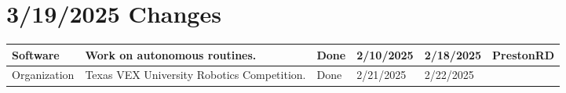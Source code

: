 \section{3/19/2025 Changes}
\begin{center}
\begin{longtable}{| p{40pt} | p{150pt} | p{35pt} | p{33pt} | p{33pt} | p{40pt} |}
\hline \rowcolor{DarkSeaGreen1}
Software & Work on autonomous routines. & Done & 2/10/2025 & 2/18/2025 & PrestonRD \\
\hline \rowcolor{DarkSeaGreen1}
Organization & Texas VEX University Robotics Competition. & Done & 2/21/2025 & 2/22/2025 & \\
\hline
\end{longtable}
\end{center}
